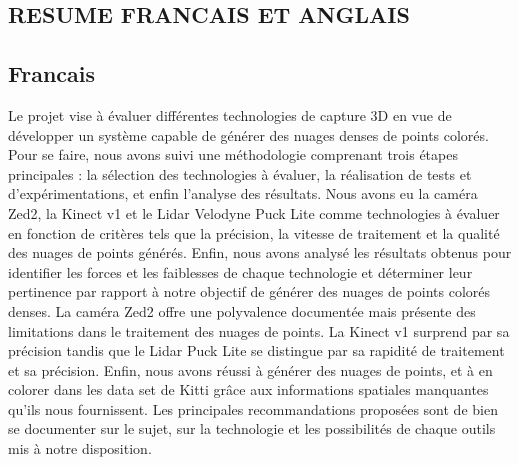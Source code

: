 \thispagestyle{empty} %
\begin{center}
    \section{\huge\textbf{{RESUME FRANCAIS ET ANGLAIS}}}
\end{center}

\subsection{Francais}
    \normalsize{
        Le projet vise à évaluer différentes technologies de capture 3D en vue de développer un système capable de générer des nuages denses de points colorés. Pour se faire, nous avons suivi une méthodologie comprenant trois étapes principales : la sélection des technologies à évaluer, la réalisation de tests et d'expérimentations, et enfin l'analyse des résultats. Nous avons eu la caméra Zed2, la Kinect v1 et le Lidar Velodyne Puck Lite comme technologies à évaluer en fonction de critères tels que la précision, la vitesse de traitement et la qualité des nuages de points générés. Enfin, nous avons analysé les résultats obtenus pour identifier les forces et les faiblesses de chaque technologie et déterminer leur pertinence par rapport à notre objectif de générer des nuages de points colorés denses.  La caméra Zed2 offre une polyvalence documentée mais présente des limitations dans le traitement des nuages de points. La Kinect v1 surprend par sa précision tandis que le Lidar Puck Lite se distingue par sa rapidité de traitement et sa précision. Enfin, nous avons réussi à générer des nuages de points, et à en colorer dans les data set de Kitti grâce aux informations spatiales manquantes qu'ils nous fournissent. Les principales recommandations proposées sont de bien se documenter sur le sujet, sur la technologie et les possibilités de chaque outils mis à notre disposition.
    }

